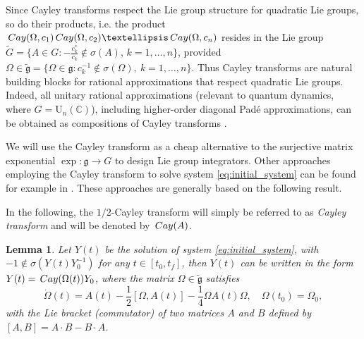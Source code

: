 \documentclass{article}
\newtheorem{lemma}{Lemma}[section]
\newcommand{\Cay}{\,{\rm Cay}}
\newcommand{\C}{\mathbb{C}}
\newcommand{\Om}{\Omega}
\begin{document}
{Since Cayley transforms respect the Lie group structure for quadratic Lie groups, so do their products, i.e. the product $\Cay(\Om,c_1)\Cay(\Om,c_2)\ldots\Cay(\Om,c_n)$ resides in the Lie group $\widetilde{G} = \{ A \in G : -\frac{c_k^\ast}{c_k} \notin \sigma (A),\, k=1,\ldots,n\}$, provided $\Om \in \widetilde{\mathfrak g} = \{ \Omega \in \mathfrak g  : c_k^{-1} \notin \sigma(\Omega),\ k=1,\ldots,n \}$. Thus Cayley transforms are natural building blocks for rational approximations that respect quadratic Lie groups. Indeed, all unitary rational approximations (relevant to quantum dynamics, where $G=\mathrm{U}_n(\C)$), including higher-order diagonal Pad\'{e} approximations, can be obtained as compositions of Cayley transforms \cite{JS2023}.



We will use the Cayley transform as a cheap alternative to the surjective matrix exponential $\exp \colon \mathfrak g \rightarrow G$ to design Lie group integrators. 
Other approaches employing the Cayley transform to solve system \eqref{eq:initial_system} can be found for example in \cite{Iserles:2001, MB:2001}. These approaches are generally based on the following result.
%

In the following, the $1/2$-Cayley transform will simply be referred to as {\em Cayley transform} and will be denoted by $\Cay(A)$.
\begin{lemma}
\label{lemma:1}
Let $Y(t)$ be the solution of system \eqref{eq:initial_system}, with $-1 \notin \sigma(Y(t)Y_0^{-1})$ for any $t \in [t_0,t_f]$,
then $Y(t)$ can be written in the form $Y(t) = \Cay(\Om(t))Y_0$, where the matrix $\Om \in \tilde{\mathfrak g}$ satisfies 
%
\begin{equation}
\label{eq:skew-Herm-prob}
\dot{\Om}(t) = A(t) - \frac{1}{2}[\Om, A(t)] - \frac{1}{4}\Om A(t) \Om, \quad \Om(t_0) = \Om_0, 
\end{equation}
%
with the Lie bracket (commutator) of two matrices $A$ and $B$ defined by $[A,B] = A\cdot B - B\cdot A$.
\end{lemma}


}
\end{document}
